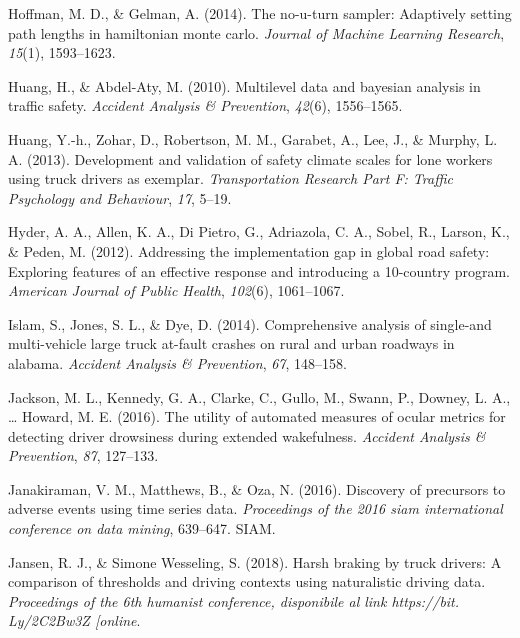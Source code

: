 \documentclass[12pt]{book}
\numberwithin{equation}{chapter}
\begin{document}
\leavevmode\hypertarget{ref-hoffman2014no}{}%
Hoffman, M. D., \& Gelman, A. (2014). The no-u-turn sampler: Adaptively setting path lengths in hamiltonian monte carlo. \emph{Journal of Machine Learning Research}, \emph{15}(1), 1593--1623.

\leavevmode\hypertarget{ref-huang2010multilevel}{}%
Huang, H., \& Abdel-Aty, M. (2010). Multilevel data and bayesian analysis in traffic safety. \emph{Accident Analysis \& Prevention}, \emph{42}(6), 1556--1565.

\leavevmode\hypertarget{ref-huang2013development}{}%
Huang, Y.-h., Zohar, D., Robertson, M. M., Garabet, A., Lee, J., \& Murphy, L. A. (2013). Development and validation of safety climate scales for lone workers using truck drivers as exemplar. \emph{Transportation Research Part F: Traffic Psychology and Behaviour}, \emph{17}, 5--19.

\leavevmode\hypertarget{ref-hyder2012addressing}{}%
Hyder, A. A., Allen, K. A., Di Pietro, G., Adriazola, C. A., Sobel, R., Larson, K., \& Peden, M. (2012). Addressing the implementation gap in global road safety: Exploring features of an effective response and introducing a 10-country program. \emph{American Journal of Public Health}, \emph{102}(6), 1061--1067.

\leavevmode\hypertarget{ref-islam2014comprehensive}{}%
Islam, S., Jones, S. L., \& Dye, D. (2014). Comprehensive analysis of single-and multi-vehicle large truck at-fault crashes on rural and urban roadways in alabama. \emph{Accident Analysis \& Prevention}, \emph{67}, 148--158.

\leavevmode\hypertarget{ref-jackson2016utility}{}%
Jackson, M. L., Kennedy, G. A., Clarke, C., Gullo, M., Swann, P., Downey, L. A., \ldots{} Howard, M. E. (2016). The utility of automated measures of ocular metrics for detecting driver drowsiness during extended wakefulness. \emph{Accident Analysis \& Prevention}, \emph{87}, 127--133.

\leavevmode\hypertarget{ref-janakiraman2016discovery}{}%
Janakiraman, V. M., Matthews, B., \& Oza, N. (2016). Discovery of precursors to adverse events using time series data. \emph{Proceedings of the 2016 siam international conference on data mining}, 639--647. SIAM.

\leavevmode\hypertarget{ref-jansen2018harsh}{}%
Jansen, R. J., \& Simone Wesseling, S. (2018). Harsh braking by truck drivers: A comparison of thresholds and driving contexts using naturalistic driving data. \emph{Proceedings of the 6th humanist conference, disponibile al link https://bit. Ly/2C2Bw3Z {[}online}.
\end{document}
